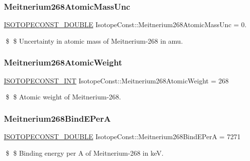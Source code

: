 \subsubsection{\texorpdfstring{Meitnerium268\+Atomic\+Mass\+Unc}{Meitnerium268AtomicMassUnc}}
{\footnotesize\ttfamily \mbox{\hyperlink{group___isotope_const-_macros_ga8f45a7272ce02c0b4c65c44636ed719a}{I\+S\+O\+T\+O\+P\+E\+C\+O\+N\+S\+T\+\_\+\+D\+O\+U\+B\+LE}} Isotope\+Const\+::\+Meitnerium268\+Atomic\+Mass\+Unc = 0.}

\$ \$ Uncertainty in atomic mass of Meitnerium-\/268 in amu. \mbox{\label{group___isotope_const-_meitnerium-_mt268_gacdde936b8213f78e66805a985d0c4074}} 
\subsubsection{\texorpdfstring{Meitnerium268\+Atomic\+Weight}{Meitnerium268AtomicWeight}}
{\footnotesize\ttfamily \mbox{\hyperlink{group___isotope_const-_macros_ga5f18360b3e99483a35c32d789e62621c}{I\+S\+O\+T\+O\+P\+E\+C\+O\+N\+S\+T\+\_\+\+I\+NT}} Isotope\+Const\+::\+Meitnerium268\+Atomic\+Weight = 268}

\$ \$ Atomic weight of Meitnerium-\/268. \mbox{\label{group___isotope_const-_meitnerium-_mt268_gad86635901a7f12c1e253cdb8fedd38aa}} 
\subsubsection{\texorpdfstring{Meitnerium268\+Bind\+E\+PerA}{Meitnerium268BindEPerA}}
{\footnotesize\ttfamily \mbox{\hyperlink{group___isotope_const-_macros_ga8f45a7272ce02c0b4c65c44636ed719a}{I\+S\+O\+T\+O\+P\+E\+C\+O\+N\+S\+T\+\_\+\+D\+O\+U\+B\+LE}} Isotope\+Const\+::\+Meitnerium268\+Bind\+E\+PerA = 7271}

\$ \$ Binding energy per A of Meitnerium-\/268 in keV. \mbox{\label{group___isotope_const-_meitnerium-_mt268_gab8ed0f051d068071778a30163440f07d}} 
